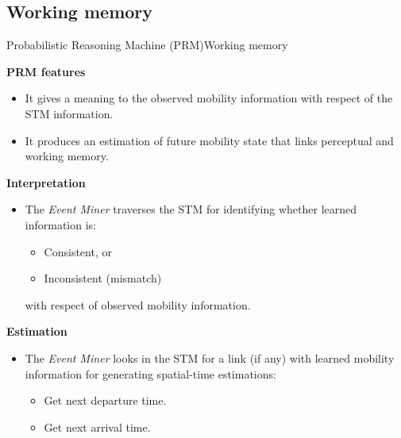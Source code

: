 \subsection{Working memory}
\begin{frame}{Probabilistic Reasoning Machine (PRM)}{Working memory}
\small
\begin{block}{\small \textbf{PRM features}}
\begin{itemize}
    \item It gives a meaning to the observed mobility information with respect of the STM information.
    \item It produces an estimation of future mobility state that links perceptual and working memory.
\end{itemize}
\end{block}

\begin{block}{\small \textbf{Interpretation}}
\begin{itemize}
  \item The \emph{Event Miner} traverses the STM for identifying whether learned information is:%
  \begin{itemize}
     \item Consistent, or
     \item Inconsistent (mismatch)
   \end{itemize}
   with respect of observed mobility information.
\end{itemize}
\end{block}

\begin{block}{\small \textbf{Estimation}}
\begin{itemize}
\item The \emph{Event Miner} looks in the STM for a link (if any) with learned mobility information for generating spatial-time estimations:
\begin{itemize}
  \item Get next departure time.
  \item Get next arrival time.
\end{itemize}
\end{itemize}
\end{block}

\end{frame}

